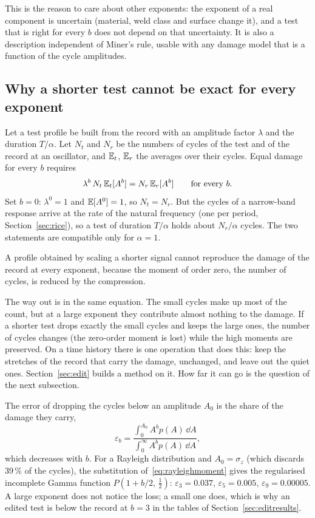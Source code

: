 This is the reason to care about other exponents: the exponent of a real component is uncertain
(material, weld class and surface change it), and a test that is right for every $b$ does not depend
on that uncertainty. It is also a description independent of Miner's rule, usable with any damage
model that is a function of the cycle amplitudes.

\subsection{Why a shorter test cannot be exact for every exponent}\label{sec:bzero}

Let a test profile be built from the record with an amplitude factor $\lambda$ and the duration
$T/\alpha$. Let $N_t$ and $N_r$ be the numbers of cycles of the test and of the record at an
oscillator, and $\mathbb{E}_t$, $\mathbb{E}_r$ the averages over their cycles. Equal damage for every $b$ requires
\begin{equation}
  \lambda^b\,N_t\,\mathbb{E}_t[A^b] = N_r\,\mathbb{E}_r[A^b]\qquad\text{for every } b .
\end{equation}
Set $b=0$: $\lambda^0 = 1$ and $\mathbb{E}[A^0] = 1$, so $N_t = N_r$. But the cycles of a narrow-band response
arrive at the rate of the natural frequency (one per period, Section~\ref{sec:rice}), so a test of
duration $T/\alpha$ holds about $N_r/\alpha$ cycles. The two statements are compatible only for
$\alpha = 1$.

\begin{result}
A profile obtained by scaling a shorter signal cannot reproduce the damage of the record at every
exponent, because the moment of order zero, the number of cycles, is reduced by the compression.
\end{result}

The way out is in the same equation. The small cycles make up most of the count, but at a large
exponent they contribute almost nothing to the damage. If a shorter test drops exactly the small cycles
and keeps the large ones, the number of cycles changes (the zero-order moment is lost) while the high
moments are preserved. On a time history there is one operation that does this: keep the stretches of
the record that carry the damage, unchanged, and leave out the quiet ones. Section~\ref{sec:edit}
builds a method on it. How far it can go is the question of the next subsection.

The error of dropping the cycles below an amplitude $A_0$ is the share of the damage they carry,
\begin{equation}
  \varepsilon_b = \frac{\int_0^{A_0} A^b p(A)\,\dd A}{\int_0^\infty A^b p(A)\,\dd A},
\end{equation}
which decreases with $b$. For a Rayleigh distribution and $A_0 = \sigma_z$ (which discards 39\,\% of
the cycles), the substitution of~\eqref{eq:rayleighmoment} gives the regularised incomplete Gamma
function $P(1+b/2,\,\tfrac12)$: $\varepsilon_3 = 0.037$, $\varepsilon_5 = 0.005$, $\varepsilon_9 =
0.00005$. A large exponent does not notice the loss; a small one does, which is why an edited test is
below the record at $b = 3$ in the tables of Section~\ref{sec:editresults}.

